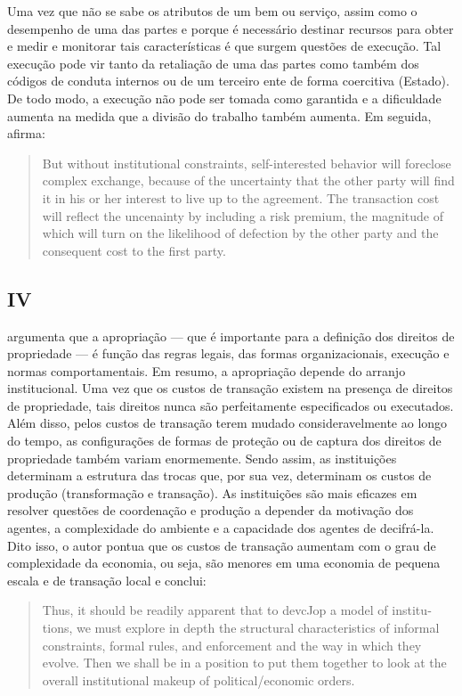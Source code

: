 Uma vez que não se sabe os atributos de um bem ou serviço, assim como o desempenho de uma das partes e porque é necessário destinar recursos para obter e medir e monitorar tais características é que surgem questões de execução. Tal execução pode vir tanto da retaliação de uma das partes como também dos códigos de conduta internos ou de um terceiro ente de forma coercitiva (Estado). De todo modo, a execução não pode ser tomada como garantida e a dificuldade aumenta na medida que a divisão do trabalho também aumenta. Em seguida, afirma:

\begin{quotation}
	But without institutional con­straints, self-interested behavior will foreclose complex exchange, be­cause of the uncertainty that the other party will find it in his or her interest to live up to the agreement. The transaction cost will reflect the uncenainty by including a risk premium, the magnitude of which will turn on the likelihood of defection by the other party and the consequent cost to the first party. 
\end{quotation}

\subsection{IV}

\autor argumenta que a apropriação --- que é importante para a definição dos direitos de propriedade --- é função das regras legais, das formas organizacionais, execução e normas comportamentais. Em resumo, a apropriação depende do arranjo institucional. Uma vez que os custos de transação existem na presença de direitos de propriedade, tais direitos nunca são perfeitamente especificados ou executados. Além disso, pelos custos de transação terem mudado consideravelmente ao longo do tempo, as configurações de formas de proteção ou de captura dos direitos de propriedade também variam enormemente. Sendo assim, as instituições determinam a estrutura das trocas que, por sua vez, determinam os custos de produção (transformação e transação). As instituições são mais eficazes em resolver questões de coordenação e produção a depender da motivação dos agentes, a complexidade do ambiente e a capacidade dos agentes de decifrá-la. Dito isso, o autor pontua que os custos de transação aumentam com o grau de complexidade da economia, ou seja, são menores em uma economia de pequena escala e de transação local e conclui:

\begin{quotation}
	Thus, it should be readily apparent that to devcJop a model
	of institu­tions, we must explore in depth the structural characteristics of informal constraints, formal rules, and enforcement and the way in which they evolve. Then we shall be in a position to put them together to look at the overall institutional makeup of political/economic orders.
	
\end{quotation}